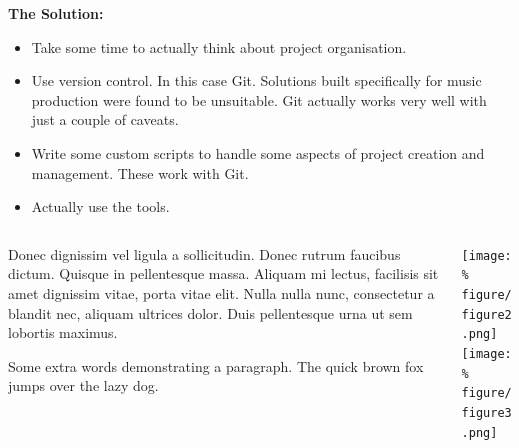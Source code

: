 \documentclass[unknownkeysallowed,usepdftitle=false, parskip=full]{beamer}
\newcommand{\secvariable}{nothing}
\newcommand{\mysection}[1]{\renewcommand{\secvariable}{#1}
}
\begin{document}
\begin{frame}\label{\secvariable}
\parbox{\linewidth}{
\textbf{The Solution:}
\begin{itemize}
    \item Take some time to actually think about project organisation.
    \item Use version control. In this case Git. Solutions built specifically for music production were found to be unsuitable. Git actually works very well with just a couple of caveats.
    \item Write some custom scripts to handle some aspects of project creation and management. These work with Git.
    \item Actually use the tools.
\end{itemize}
}
\end{frame}

\mysection{radar}
\begin{frame}\label{\secvariable}
  \begin{columns}[t]
    \begin{column}[c]{0.45\textwidth}
    \parbox{\linewidth}{

      Donec dignissim vel ligula a sollicitudin. Donec rutrum faucibus dictum. Quisque in pellentesque massa. Aliquam mi lectus, facilisis sit amet dignissim vitae, porta vitae elit. Nulla nulla nunc, consectetur a blandit nec, aliquam ultrices dolor. Duis pellentesque urna ut sem lobortis maximus.
      
      \vspace{12pt}
      
	  Some extra words demonstrating a paragraph. The quick brown fox jumps over the lazy dog.
      }
    \end{column}
    \begin{column}[c]{0.45\textwidth}
\texttt{[image: \%
figure/figure2.png]}\\
\vspace{12pt}
\texttt{[image: \%
figure/figure3.png]}
    \end{column}
  \end{columns}

  
\end{frame}
\end{document}
